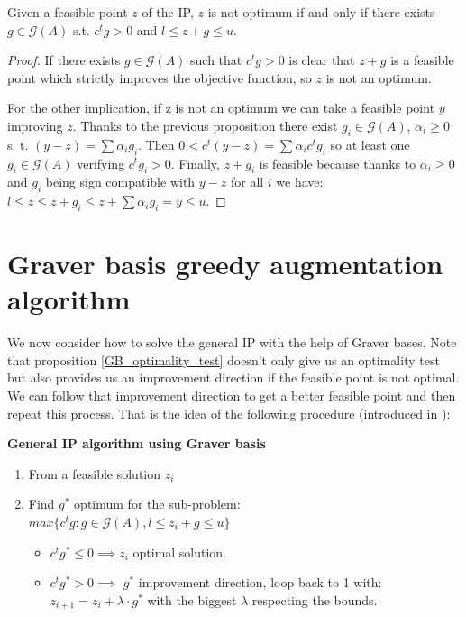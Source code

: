 \begin{proposition}\label{GB_optimality_test}
Given a feasible point $z$ of the IP, $z$ is not optimum if and only if there exists $g \in \mathcal{G}(A)$ s.t. $c^tg > 0$ and $l \leq z + g \leq u$.
\end{proposition}
\vspace{-20pt}
\begin{proof}
If there exists $g \in \mathcal{G}(A)$ such that $c^tg > 0$ is clear that $z + g$ is a feasible point which strictly improves the objective function, so $z$ is not an optimum. 

For the other implication, if z is not an optimum we can take a feasible point $y$ improving $z$. Thanks to the previous proposition there exist $g_i \in \mathcal{G}(A)$, $\alpha_i \geq 0$ s. t. $(y - z) = \sum \alpha_i g_i$. Then $0 < c^t(y - z) = \sum \alpha_i c^t g_i$ so at least one $g_i \in \mathcal{G}(A)$ verifying $c^tg_i > 0$. Finally, $z + g_i$ is feasible because thanks to $\alpha_i \geq 0$ and $g_i$ being sign compatible with $y - z$ for all $i$ we have: $l \leq z \leq z + g_i \leq z + \sum \alpha_i g_i = y \leq u$.

\end{proof}

\section{Graver basis greedy augmentation algorithm}

We now consider how to solve the general IP with the help of Graver bases. Note that proposition \ref{GB_optimality_test} doesn't only give us an optimality test but also provides us an improvement direction if the feasible point is not optimal. We can follow that improvement direction to get a better feasible point and then repeat this process. That is the idea of the following procedure (introduced in \cite{GRAVER:1975}):


\textbf{General IP algorithm using Graver basis} \label{GB_greedy_algorithm}
\vspace{-8pt}
\begin{enumerate}
    \item From a feasible solution $z_i$
    \item Find $g^*$ optimum for the sub-problem: \vspace{4pt}\\
          $max\{c^tg : g \in \mathcal{G}(A), l \leq z_i + g \leq u \}$ \vspace{4pt}
    \begin{itemize}
        \item $c^tg^* \leq 0 \implies z_i$ optimal solution.
        \item $c^tg^* > 0 \implies$ $g^*$ improvement direction, loop back to 1 with:\\ $z_{i+1} = z_i + \lambda \cdot g^*$ with the biggest $\lambda$ respecting the bounds.
    \end{itemize}
\end{enumerate}

